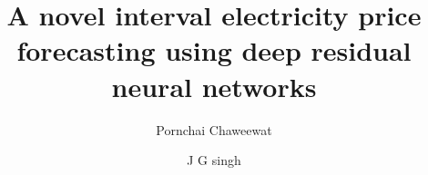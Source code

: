 \documentclass[review]{elsarticle}
\begin{document}
  \begin{frontmatter}

    \title{A novel interval electricity price forecasting using deep residual neural networks}

    \author{Pornchai Chaweewat}
    \author{J G singh}

    \address{Department of Energy, Environmental and Climate Change, School of Environmental, Resource and Development, Asian Institute of Thechnology, Thailand}



\end{frontmatter}
\end{document}
